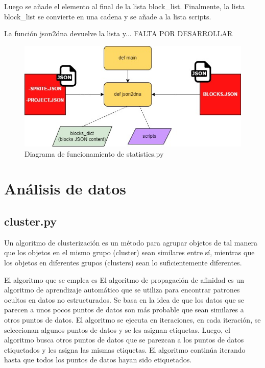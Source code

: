 \documentclass[a4paper, 12pt]{book}
\begin{document}
Luego se añade el elemento al final de la lista block\_list. Finalmente, la lista block\_list se convierte en una cadena y se añade a la lista scripts. 


La función json2dna devuelve la lista y... FALTA POR DESARROLLAR

\begin{figure}[!htb]
  \centering
  \includegraphics[width=13cm, keepaspectratio]{img/flow_statistics.jpg}
  \caption{Diagrama de funcionamiento de statistics.py}
  \label{fig:flow_statistics}
\end{figure}

\section{Análisis de datos} 
\label{sec:extracciondatos}

\subsection{cluster.py}

Un algoritmo de clusterización es un método para agrupar objetos de tal manera que los objetos en el mismo grupo (cluster) sean similares entre sí, mientras que los objetos en diferentes grupos (clusters) sean lo suficientemente diferentes.

El algoritmo que se emplea es El algoritmo de propagación de afinidad es un algoritmo de aprendizaje automático que se utiliza para encontrar patrones ocultos en datos no estructurados. Se basa en la idea de que los datos que se parecen a unos pocos puntos de datos son más probable que sean similares a otros puntos de datos. El algoritmo se ejecuta en iteraciones, en cada iteración, se seleccionan algunos puntos de datos y se les asignan etiquetas. Luego, el algoritmo busca otros puntos de datos que se parezcan a los puntos de datos etiquetados y les asigna las mismas etiquetas. El algoritmo continúa iterando hasta que todos los puntos de datos hayan sido etiquetados.
\end{document}
